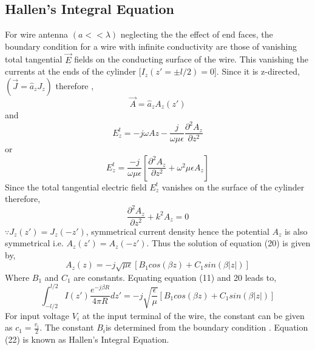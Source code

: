 \documentclass[aps,prstab,twocolumn,superscriptaddress,groupedaddress,showkeys,nofootinbib]{revtex4}  %
\begin{document}
\subsection{Hallen's Integral Equation}
For wire antenna $(a<<\lambda)$ neglecting the the effect of end faces, the boundary condition for a wire with infinite conductivity are those of vanishing total tangential $\vec{E}$ fields on the conducting surface of the wire. This vanishing the currents at the ends of the cylinder [$I_{z}(z'=\pm l/2)=0$]. Since it is z-directed, $ (\vec{J}=\hat{a}_{z}J_{z})$ therefore \cite{bala},
\begin{equation}
\vec{A}=\hat{a}_{z}A_{z}(z')
\end{equation}
and 
\begin{equation}
E^{t}_{z}=-j \omega A{z}-\frac{j}{\omega \mu \epsilon}\frac{\partial^2 A_{z}}{\partial z^2}
\end{equation}
or
\begin{equation}
E^{t}_{z}=\frac{-j}{\omega \mu \epsilon}\left [ \frac{\partial^2 A_{z}}{\partial z^2}+\omega ^{2} \mu \epsilon A_{z} \right ]
\end{equation}
Since the total tangential electric field $E^{t}_{z}$ vanishes on the surface of the cylinder therefore,
\begin{equation}
\frac{\partial^2 A_{z}}{\partial z^2}+k^{2} A_{z}=0
\end{equation}
$\because J_{z}(z')=J_{z}(-z')$, symmetrical current density hence the potential $A_{z}$ is also symmetrical i.e. $ A_{z}(z')=A_{z}(-z')$. Thus the solution of equation (20) is given by,
\begin{equation}
A_{z}(z)=-j \sqrt{\mu \epsilon}\left [ B_{1}cos(\beta z)+C_{1}sin(\beta \left |z  \right |) \right ]
\end{equation}
Where $B_{1}$ and $C_{1}$ are constants. Equating equation (11) and 20 leads to,
\begin{equation}
\int_{-l/2}^{l/2}I(z')\frac{e^{-j \beta R }}{4 \pi R} dz'=-j \sqrt{\frac{\epsilon}{\mu}}\left [ B_{1}cos(\beta z)+C_{1}sin(\beta \left |z  \right |) \right ]
\end{equation}
For input voltage $V_{i}$ at the input terminal of the wire, the constant can be given as $c_{1}=\frac{v_{i}}{2}$. The constant $B_{i}$is determined from the boundary condition \cite{class}. Equation (22) is known as Hallen's Integral Equation. 
\end{document}
